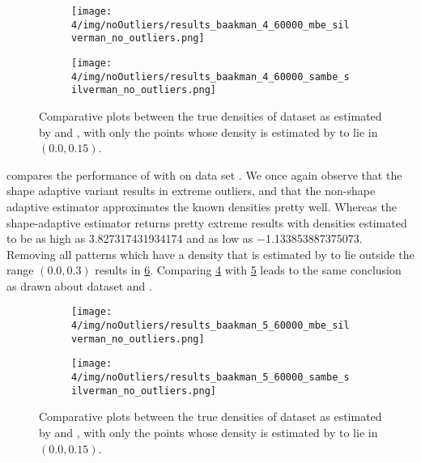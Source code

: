 		\begin{figure}
			\centering
			\begin{subfigure}{0.6\columnwidth}
				\centering
				\texttt{[image: 4/img/noOutliers/results\_baakman\_4\_60000\_mbe\_silverman\_no\_outliers.png]}
				\caption{\mbe}
				\label{fig:results:baakman4:noOutliers:mbe}
			\end{subfigure}
			\begin{subfigure}{0.6\columnwidth}
				\centering
				\texttt{[image: 4/img/noOutliers/results\_baakman\_4\_60000\_sambe\_silverman\_no\_outliers.png]}
				\caption{\sambe}
				\label{fig:results:baakman4:noOUtliers:sambe}
			\end{subfigure}	
			\caption{Comparative plots between the true densities of dataset \baakmanFour as estimated by  \mbe and  \sambe, with only the points whose density is estimated by \sambe to lie in $\left(\num{0.0}, \num{0.15} \right)$.}
			\label{fig:results:baakman4:noOutliers}
		\end{figure}

		 compares the performance of \mbe with \sambe on data set \numberstringnum{\baakmanFiveNum}. We once again observe that the shape adaptive variant results in extreme outliers, and that the non-shape adaptive estimator approximates the known densities pretty well. Whereas the shape-adaptive estimator returns pretty extreme results with densities estimated to be as high as \num{3.827317431934174} and as low as \num{-1.133853887375073}.
		Removing all patterns which have a density that is estimated by \sambe to lie outside the range $\left(\num{0.0}, \num[round-precision=2]{0.3} \right)$ results in \cref{fig:results:baakman5:noOutliers}. Comparing \cref{fig:results:baakman5:noOutliers:mbe} with \cref{fig:results:baakman5:noOUtliers:sambe} leads to the same conclusion as drawn about dataset \baakmanOne and \baakmanFour.

		\begin{figure}
			\centering
			\begin{subfigure}{0.6\columnwidth}
				\centering
				\texttt{[image: 4/img/noOutliers/results\_baakman\_5\_60000\_mbe\_silverman\_no\_outliers.png]}
				\caption{\mbe}
				\label{fig:results:baakman5:noOutliers:mbe}
			\end{subfigure}
			\begin{subfigure}{0.6\columnwidth}
				\centering
				\texttt{[image: 4/img/noOutliers/results\_baakman\_5\_60000\_sambe\_silverman\_no\_outliers.png]}
				\caption{\sambe}
				\label{fig:results:baakman5:noOUtliers:sambe}
			\end{subfigure}	
			\caption{Comparative plots between the true densities of dataset \baakmanFive as estimated by  \mbe and  \sambe, with only the points whose density is estimated by \sambe to lie in $\left(\num{0.0}, \num{0.15} \right)$.}
			\label{fig:results:baakman5:noOutliers}
		\end{figure}

